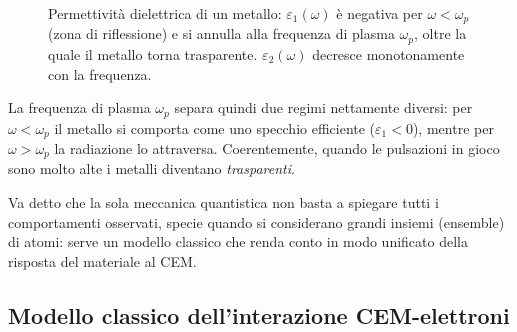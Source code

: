 \begin{figure}[htbp]
    \centering
    \caption{Permettività dielettrica di un metallo: \( \varepsilon_1(\omega) \) è negativa per \( \omega < \omega_p \) (zona di riflessione) e si annulla alla frequenza di plasma \( \omega_p \), oltre la quale il metallo torna trasparente. \( \varepsilon_2(\omega) \) decresce monotonamente con la frequenza.}
    \label{fig:eps_metalli}
\end{figure}

La frequenza di plasma \( \omega_p \) separa quindi due regimi nettamente diversi: per \( \omega < \omega_p \) il metallo si comporta come uno specchio efficiente (\( \varepsilon_1 < 0 \)), mentre per \( \omega > \omega_p \) la radiazione lo attraversa. Coerentemente, quando le pulsazioni in gioco sono molto alte i metalli diventano \emph{trasparenti}.

Va detto che la sola meccanica quantistica non basta a spiegare tutti i comportamenti osservati, specie quando si considerano grandi insiemi (ensemble) di atomi: serve un modello classico che renda conto in modo unificato della risposta del materiale al CEM.

\subsection{Modello classico dell'interazione CEM-elettroni}

